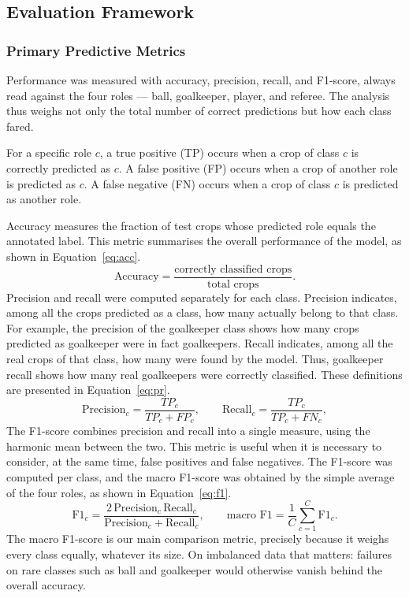 \documentclass[preprint,12pt]{elsarticle}
\begin{document}
\subsection{Evaluation Framework}

\subsubsection{Primary Predictive Metrics}

Performance was measured with accuracy, precision, recall, and F1-score, always read against the four roles --- ball, goalkeeper, player, and referee. The analysis thus weighs not only the total number of correct predictions but how each class fared.

For a specific role $c$, a true positive (TP) occurs when a crop of class $c$ is correctly predicted as $c$. A false positive (FP) occurs when a crop of another role is predicted as $c$. A false negative (FN) occurs when a crop of class $c$ is predicted as another role.

Accuracy measures the fraction of test crops whose predicted role equals the annotated label. This metric summarises the overall performance of the model, as shown in Equation~\eqref{eq:acc}.
\begin{equation}
\text{Accuracy} = \frac{\text{correctly classified crops}}{\text{total crops}}.
\label{eq:acc}
\end{equation}
Precision and recall were computed separately for each class. Precision indicates, among all the crops predicted as a class, how many actually belong to that class. For example, the precision of the goalkeeper class shows how many crops predicted as goalkeeper were in fact goalkeepers. Recall indicates, among all the real crops of that class, how many were found by the model. Thus, goalkeeper recall shows how many real goalkeepers were correctly classified. These definitions are presented in Equation~\eqref{eq:pr}.
\begin{equation}
\text{Precision}_c = \frac{TP_c}{TP_c + FP_c}, \qquad
\text{Recall}_c = \frac{TP_c}{TP_c + FN_c},
\label{eq:pr}
\end{equation}
The F1-score combines precision and recall into a single measure, using the harmonic mean between the two. This metric is useful when it is necessary to consider, at the same time, false positives and false negatives. The F1-score was computed per class, and the macro F1-score was obtained by the simple average of the four roles, as shown in Equation~\eqref{eq:f1}.
\begin{equation}
\text{F1}_c = \frac{2\,\text{Precision}_c\,\text{Recall}_c}{\text{Precision}_c + \text{Recall}_c}, \qquad
\text{macro F1} = \frac{1}{C}\sum_{c=1}^{C}\text{F1}_c.
\label{eq:f1}
\end{equation}
The macro F1-score is our main comparison metric, precisely because it weighs every class equally, whatever its size. On imbalanced data that matters: failures on rare classes such as ball and goalkeeper would otherwise vanish behind the overall accuracy.
\end{document}
